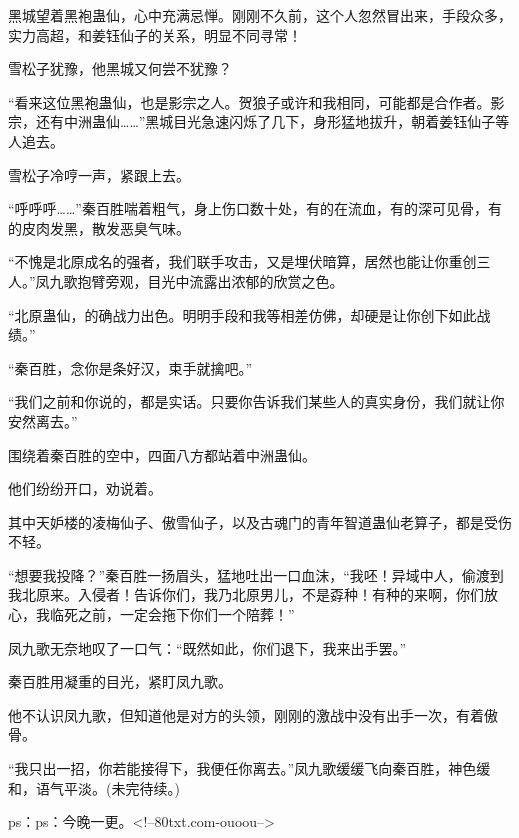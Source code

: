 \begin{this_body}
黑城望着黑袍蛊仙，心中充满忌惮。刚刚不久前，这个人忽然冒出来，手段众多，实力高超，和姜钰仙子的关系，明显不同寻常！

雪松子犹豫，他黑城又何尝不犹豫？

“看来这位黑袍蛊仙，也是影宗之人。贺狼子或许和我相同，可能都是合作者。影宗，还有中洲蛊仙……”黑城目光急速闪烁了几下，身形猛地拔升，朝着姜钰仙子等人追去。

雪松子冷哼一声，紧跟上去。

“呼呼呼……”秦百胜喘着粗气，身上伤口数十处，有的在流血，有的深可见骨，有的皮肉发黑，散发恶臭气味。

“不愧是北原成名的强者，我们联手攻击，又是埋伏暗算，居然也能让你重创三人。”凤九歌抱臂旁观，目光中流露出浓郁的欣赏之色。

“北原蛊仙，的确战力出色。明明手段和我等相差仿佛，却硬是让你创下如此战绩。”

“秦百胜，念你是条好汉，束手就擒吧。”

“我们之前和你说的，都是实话。只要你告诉我们某些人的真实身份，我们就让你安然离去。”

围绕着秦百胜的空中，四面八方都站着中洲蛊仙。

他们纷纷开口，劝说着。

其中天妒楼的凌梅仙子、傲雪仙子，以及古魂门的青年智道蛊仙老算子，都是受伤不轻。

“想要我投降？”秦百胜一扬眉头，猛地吐出一口血沫，“我呸！异域中人，偷渡到我北原来。入侵者！告诉你们，我乃北原男儿，不是孬种！有种的来啊，你们放心，我临死之前，一定会拖下你们一个陪葬！”

凤九歌无奈地叹了一口气：“既然如此，你们退下，我来出手罢。”

秦百胜用凝重的目光，紧盯凤九歌。

他不认识凤九歌，但知道他是对方的头领，刚刚的激战中没有出手一次，有着傲骨。

“我只出一招，你若能接得下，我便任你离去。”凤九歌缓缓飞向秦百胜，神色缓和，语气平淡。(未完待续。)

ps：ps：今晚一更。<!--80txt.com-ouoou-->

\end{this_body}

